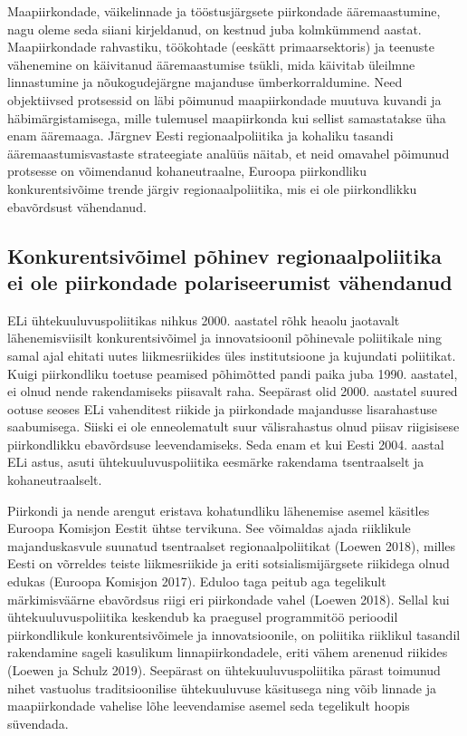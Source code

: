 \documentclass[]{book}
\begin{document}
Maapiirkondade, väikelinnade ja tööstusjärgsete piirkondade ääremaastumine, nagu oleme seda siiani
kirjeldanud, on kestnud juba kolmkümmend aastat. Maapiirkondade rahvastiku, töökohtade (eeskätt
primaarsektoris) ja teenuste vähenemine on käivitanud ääremaastumise tsükli, mida käivitab üleilmne
linnastumine ja nõukogudejärgne majanduse ümberkorraldumine. Need objektiivsed protsessid on läbi
põimunud maapiirkondade muutuva kuvandi ja häbimärgistamisega, mille tulemusel maapiirkonda kui sellist
samastatakse üha enam ääremaaga. Järgnev Eesti regionaalpoliitika ja kohaliku tasandi
ääremaastumisvastaste strateegiate analüüs näitab, et neid omavahel põimunud protsesse on võimendanud
kohaneutraalne, Euroopa piirkondliku konkurentsivõime trende järgiv regionaalpoliitika, mis ei ole
piirkondlikku ebavõrdsust vähendanud.

\hypertarget{konkurentsivoimel-pohinev-regionaalpoliitika-ei-ole-piirkondade-polariseerumist-vahendanud}{%
\subsection{Konkurentsivõimel põhinev regionaalpoliitika ei ole piirkondade polariseerumist vähendanud}\label{konkurentsivoimel-pohinev-regionaalpoliitika-ei-ole-piirkondade-polariseerumist-vahendanud}}

ELi ühtekuuluvuspoliitikas nihkus 2000. aastatel rõhk heaolu jaotavalt lähenemisviisilt konkurentsivõimel ja
innovatsioonil põhinevale poliitikale ning samal ajal ehitati uutes liikmesriikides üles institutsioone ja
kujundati poliitikat. Kuigi piirkondliku toetuse peamised põhimõtted pandi paika juba 1990. aastatel, ei olnud
nende rakendamiseks piisavalt raha. Seepärast olid 2000. aastatel suured ootuse seoses ELi vahenditest
riikide ja piirkondade majandusse lisarahastuse saabumisega. Siiski ei ole enneolematult suur välisrahastus
olnud piisav riigisisese piirkondlikku ebavõrdsuse leevendamiseks. Seda enam et kui Eesti 2004. aastal ELi
astus, asuti ühtekuuluvuspoliitika eesmärke rakendama tsentraalselt ja kohaneutraalselt.

Piirkondi ja nende arengut eristava kohatundliku lähenemise asemel käsitles Euroopa Komisjon Eestit ühtse
tervikuna. See võimaldas ajada riiklikule majanduskasvule suunatud tsentraalset regionaalpoliitikat (Loewen
2018), milles Eesti on võrreldes teiste liikmesriikide ja eriti sotsialismijärgsete riikidega olnud edukas
(Euroopa Komisjon 2017). Eduloo taga peitub aga tegelikult märkimisväärne ebavõrdsus riigi eri piirkondade
vahel (Loewen 2018). Sellal kui ühtekuuluvuspoliitika keskendub ka praegusel programmitöö perioodil
piirkondlikule konkurentsivõimele ja innovatsioonile, on poliitika riiklikul tasandil rakendamine sageli
kasulikum linnapiirkondadele, eriti vähem arenenud riikides (Loewen ja Schulz 2019). Seepärast on
ühtekuuluvuspoliitika pärast toimunud nihet vastuolus traditsioonilise ühtekuuluvuse käsitusega ning võib
linnade ja maapiirkondade vahelise lõhe leevendamise asemel seda tegelikult hoopis süvendada.
\end{document}
